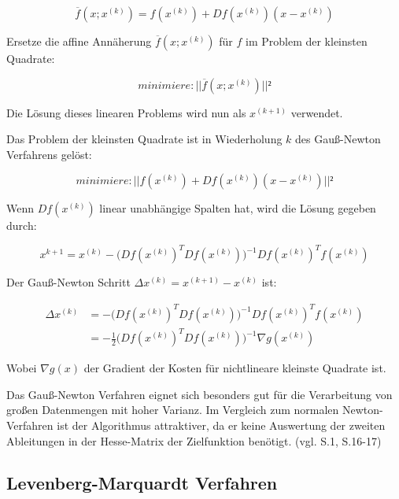 \begin{equation}
\overline{f}(x;x^{(k)}) = f(x^{(k)})+Df(x^{(k)})(x-x^{(k)})
\end{equation}

Ersetze die affine Annäherung $ \overline{f}(x;x^{(k)})$ für $f$ im Problem der kleinsten Quadrate:

\begin{equation}
minimiere: ||\overline{f}(x;x^{(k)})||²
\end{equation}

Die Lösung dieses linearen Problems wird nun als $x^{(k+1)}$ verwendet. 

Das Problem der kleinsten Quadrate ist in Wiederholung $k$ des Gauß-Newton Verfahrens gelöst:

\begin{equation}
minimiere: ||f(x^{(k)}) + Df(x^{(k)})(x-x^{(k)})||²
\end{equation}

Wenn $Df(x^{(k)}) $ linear unabhängige Spalten hat, wird die Lösung gegeben durch:

\begin{equation}
x^{k+1} = x^{(k)}-\Big(Df(x^{(k)})^TDf(x^{(k)})\Big)^{-1} Df(x^{(k)})^T f(x^{(k)})
\end{equation}

Der Gauß-Newton Schritt $\Delta x^{(k)} = x^{(k+1)} - x^{(k)}$ ist:

\begin{equation}
\begin{aligned}
\Delta x^{(k)} &= -\Big(Df(x^{(k)})^TDf(x^{(k)})\Big)^{-1} Df(x^{(k)})^T f(x^{(k)})\\ &= -\frac{1}{2} \Big(Df(x^{(k)})^TDf(x^{(k)})\Big)^{-1} \nabla g(x^{(k)})
\end{aligned}
\end{equation}

Wobei $\nabla g(x)$ der Gradient der Kosten für nichtlineare kleinste Quadrate ist.

Das Gauß-Newton Verfahren eignet sich besonders gut für die Verarbeitung von großen Datenmengen mit hoher Varianz. Im Vergleich zum normalen Newton-Verfahren ist der Algorithmus attraktiver, da er keine Auswertung der zweiten Ableitungen in der Hesse-Matrix der Zielfunktion benötigt. (vgl. \cite{approx_gn} S.1, \cite{nonlinear_1} S.16-17)


\subsection{Levenberg-Marquardt Verfahren}

